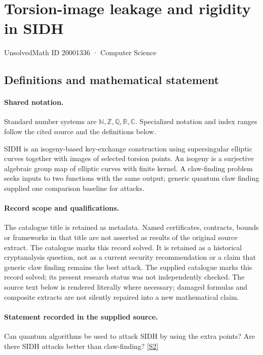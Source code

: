 \documentclass[11pt]{article}
\newcommand{\sref}[2]{\hyperlink{source:#1:#2}{[S#2]}}
\begin{document}
\setcounter{section}{20001335}
\section{Torsion-image leakage and rigidity in SIDH}\label{20001336}
{\small\sffamily UnsolvedMath ID 20001336 · Computer Science}
\subsection{Definitions and mathematical statement}

\paragraph{Shared notation.}Standard number systems are $\mathbb N,\mathbb Z,\mathbb Q,\mathbb R,\mathbb C$. Specialized notation and index ranges follow the cited source and the definitions below.


SIDH is an isogeny-based key-exchange construction using supersingular elliptic curves together with images of selected torsion points. An isogeny is a surjective algebraic group map of elliptic curves with finite kernel. A claw-finding problem seeks inputs to two functions with the same output; generic quantum claw finding supplied one comparison baseline for attacks.
\paragraph{Record scope and qualifications.}
The catalogue title is retained as metadata. Named certificates, contracts, bounds or frameworks in that title are not asserted as results of the original source extract.
The catalogue marks this record solved. It is retained as a historical cryptanalysis question, not as a current security recommendation or a claim that generic claw finding remains the best attack. The supplied catalogue marks this record solved; its present research status was not independently checked.
The source text below is rendered literally where necessary; damaged formulas and composite extracts are not silently repaired into a new mathematical claim.
\paragraph{Statement recorded in the supplied source.}
Can quantum algorithms be used to attack SIDH by using the extra points? Are there SIDH attacks better than claw-finding? \sref{20001336}{2}
\end{document}
